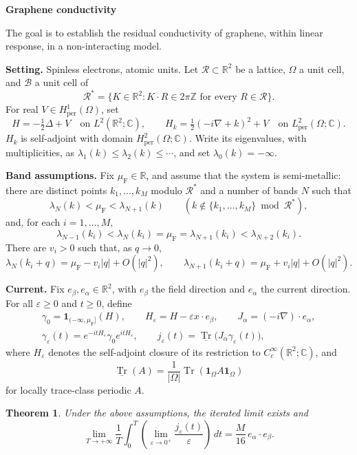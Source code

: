 \documentclass[11pt,a4paper]{article}
\DeclareMathOperator{\Tr}{Tr}
\newcommand{\trv}{\underline{\Tr}}
\newcommand{\R}{\mathbb{R}}
\newcommand{\C}{\mathbb{C}}
\newcommand{\ind}{\mathbf{1}}
\newtheorem*{theorem}{Theorem}
\begin{document}
\begin{center}
  {\Large\bfseries Graphene conductivity}
\end{center}
The goal is to establish the residual conductivity of graphene, within
linear response, in a non-interacting model.

\textbf{Setting.}
Spinless electrons, atomic units.
Let $\mathcal R\subset\R^2$ be a lattice, $\Omega$ a unit cell, and
$\mathcal B$ a unit cell of
\[
  \mathcal R^*=\{K\in\R^2:K\cdot R\in2\pi\mathbb Z
  \text{ for every }R\in\mathcal R\}.
\]
For real $V\in H^1_{\mathrm{per}}(\Omega)$, set
\[
  H=-\tfrac12\Delta+V\quad\text{on }L^2(\R^2;\C),
  \qquad
  H_k=\tfrac12(-i\nabla+k)^2+V
  \quad\text{on }L^2_{\mathrm{per}}(\Omega;\C).
\]
$H_k$ is self-adjoint with domain
$H^2_{\mathrm{per}}(\Omega;\C)$. Write its eigenvalues, with multiplicities, as
$\lambda_1(k)\leq\lambda_2(k)\leq\cdots$, and set
$\lambda_0(k)=-\infty$.

\textbf{Band assumptions.}
Fix $\mu_{\mathrm F}\in\R$, and assume that the system is semi-metallic: there are
distinct points
$k_1,\ldots,k_M$ modulo $\mathcal R^*$ and a number of bands $N$ such that
\[
  \lambda_N(k)<\mu_{\mathrm F}<\lambda_{N+1}(k)
  \qquad(k\notin\{k_1,\ldots,k_M\}\bmod\mathcal R^*),
\]
and, for each $i=1,\ldots,M$,
\[
  \lambda_{N-1}(k_i)<\lambda_N(k_i)=\mu_{\mathrm F}
  =\lambda_{N+1}(k_i)<\lambda_{N+2}(k_i).
\]
There are $v_i>0$ such that, as $q\to0$,
\[
  \lambda_N(k_i+q)=\mu_{\mathrm F}-v_i|q|+O(|q|^2),
  \qquad
  \lambda_{N+1}(k_i+q)=\mu_{\mathrm F}+v_i|q|+O(|q|^2).
\]

\textbf{Current.}
Fix $e_{\beta},e_{\alpha}\in\R^2$, with $e_{\beta}$ the field direction
and $e_{\alpha}$ the current direction.
For all $\varepsilon\geq0$ and $t\geq0$, define
\begin{gather*}
  \gamma_0=\ind_{(-\infty,\mu_{\mathrm F}]}(H),
  \qquad H_\varepsilon=H-\varepsilon x\cdot e_{\beta},
  \qquad J_{\alpha}=(-i\nabla)\cdot e_{\alpha},\\
  \gamma_\varepsilon(t)
  =e^{-itH_\varepsilon}\gamma_0e^{itH_\varepsilon},
  \qquad
  j_\varepsilon(t)
  =\trv\bigl(J_{\alpha}\gamma_\varepsilon(t)\bigr),
\end{gather*}
where $H_\varepsilon$ denotes the self-adjoint closure of its
restriction to $C_c^\infty(\R^2;\C)$, and
\[
  \trv(A)=\frac1{|\Omega|}\Tr(\ind_\Omega A\ind_\Omega)
\]
for locally trace-class periodic $A$.

\begin{theorem}
Under the above assumptions, the iterated limit exists and
\[
\lim_{T\to+\infty}\frac1T\int_0^T
  \left(\lim_{\varepsilon\to0^+}
  \frac{j_\varepsilon(t)}{\varepsilon}\right)\,dt
  =\frac{M}{16}\,e_{\alpha}\cdot e_{\beta}.
\]
\end{theorem}
\end{document}
